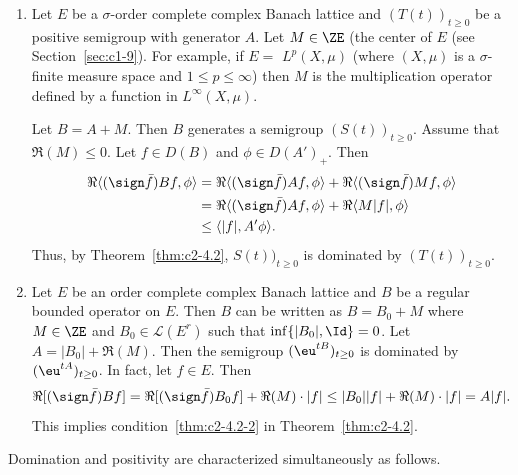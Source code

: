 \begin{example}\label{ex:c2-4.4} 
\begin{enumerate}[\upshape (i), wide, labelindent=.25em] %
\item \label{ex:c2-4.4-1}
Let $E$ be a $\sigma$-order complete complex Banach lattice and $(T(t))_{t \geq 0}$ be a positive semigroup with generator $A$. 
Let $M \in \ZE$ (the center of\/ $E$ (see Section~\ref{sec:c1-9}). 
For example, if\/ $E =$ $L^{p}(X,\mu)$ (where $(X,\mu)$ is a $\sigma$-finite measure space and $1 \leq p \leq \infty$) then $M$ is the multiplication operator defined by a function in $L^{\infty}(X,\mu)$.

Let $B = A + M$. Then $B$ generates a semigroup $(S(t))_{t \geq 0}$.
Assume that $\Re(M) \leq 0$. Let $f \in D(B)$ and $\phi \in D(A')_{+}$. Then
\begin{align*}
\Re\langle(\sign  \bar{f})Bf,\phi\rangle &= \Re\langle(\sign  \bar{f})Af,\phi\rangle + \Re\langle(\sign  \bar{f})Mf,\phi\rangle\\
&= \Re\langle(\sign  \bar{f})Af,\phi\rangle + \Re\langle M|f|,\phi\rangle\\
&\leq \langle|f|,A'\phi\rangle.
\end{align*}
Thus, by Theorem~\ref{thm:c2-4.2}, $S(t))_{t \geq 0}$ is dominated by $(T(t))_{t \geq 0}$.
\item \label{ex:c2-4.4-2}
Let $E$ be an order complete complex Banach lattice and $B$ be a regular bounded operator on $E$. 
Then $B$ can be written as $B = B_{0} + M$ where $M \in \ZE$ and $B_{0} \in \mathcal{L}(E^{r})$ 
such that $\inf \{|B_{0}|, \Id\} = 0$.
Let $A = |B_{0}| + \Re(M)$. 
Then the semigroup $(\eu^{tB})_{t \geq 0}$ is dominated by $(\eu^{tA})_{t \geq 0}$. 
In fact, let $f \in E$. 
Then 
%
\[
	\Re[(\sign  \bar{f})Bf] = \Re[(\sign \bar{f})B_{0}f] + \Re(M) \cdot |f| \leq |B_{0}||f| + \Re(M) 
		\cdot |f| = A|f| .
\]
%
This implies condition~\ref{thm:c2-4.2-2} in Theorem~\ref{thm:c2-4.2}.
\end{enumerate}
\end{example}

Domination and positivity are characterized simultaneously as
follows.

